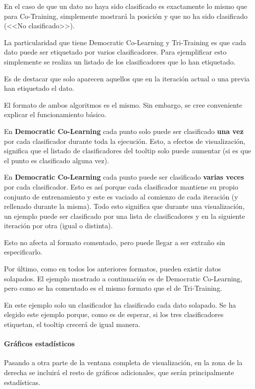 En el caso de que un dato no haya sido clasificado es exactamente lo mismo que
para Co-Training, simplemente mostrará la posición y que no ha sido clasificado
(<<No clasificado>>).

La particularidad que tiene Democratic Co-Learning y Tri-Training es que cada
dato puede ser etiquetado por varios clasificadores. Para ejemplificar esto
simplemente se realiza un listado de los clasificadores que lo han etiquetado.


Es de destacar que solo aparecen aquellos que en la iteración actual o una
previa han etiquetado el dato.

El formato de ambos algoritmos es el mismo. Sin embargo, se cree conveniente
explicar el funcionamiento básico.

En \textbf{Democratic Co-Learning} cada punto solo puede ser clasificado
\textbf{una vez} por cada clasificador durante toda la ejecución. Esto, a
efectos de visualización, significa que el listado de clasificadores del tooltip
solo puede aumentar (si es que el punto es clasificado alguna vez).

En \textbf{Democratic Co-Learning} cada punto puede ser clasificado
\textbf{varias veces} por cada clasificador. Esto es así porque cada
clasificador mantiene su propio conjunto de entrenamiento y este es vaciado al
comienzo de cada iteración (y rellenado durante la misma). Todo esto significa
que durante una visualización, un ejemplo puede ser clasificado por una lista de
clasificadores y en la siguiente iteración por otra (igual o distinta).

Esto no afecta al formato comentado, pero puede llegar a ser extraño sin
especificarlo.

Por último, como en todos los anteriores formatos, pueden existir datos
solapados. El ejemplo mostrado a continuación es de Democratic Co-Learning, pero
como se ha comentado es el mismo formato que el de Tri-Training.


En este ejemplo solo un clasificador ha clasificado cada dato solapado. Se ha
elegido este ejemplo porque, como es de esperar, si los tres clasificadores
etiquetan, el tooltip crecerá de igual manera.

\paragraph{Gráficos estadísticos} Pasando a otra parte de la ventana completa de
visualización, en la zona de la derecha se incluirá el resto de gráficos
adicionales, que serán principalmente estadísticas.

